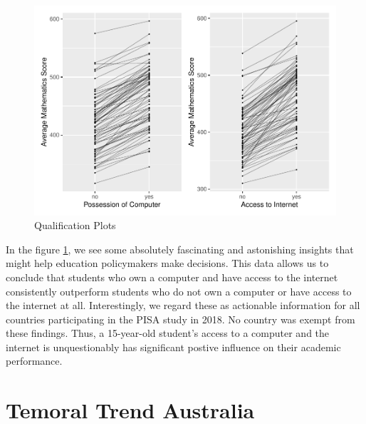 \begin{Schunk}
\begin{figure}[H]
\includegraphics[width=1\linewidth]{learningtower_files/figure-latex/compint-plot-1} \caption[Qualification Plots]{Qualification Plots}\label{fig:compint-plot}
\end{figure}
\end{Schunk}

In the figure \ref{fig:compint-plot}, we see some absolutely fascinating
and astonishing insights that might help education policymakers make
decisions. This data allows us to conclude that students who own a
computer and have access to the internet consistently outperform
students who do not own a computer or have access to the internet at
all. Interestingly, we regard these as actionable information for all
countries participating in the PISA study in 2018. No country was exempt
from these findings. Thus, a 15-year-old student's access to a computer
and the internet is unquestionably has significant postive influence on
their academic performance.

\hypertarget{temoral-trend-australia}{%
\section{Temoral Trend Australia}\label{temoral-trend-australia}}

